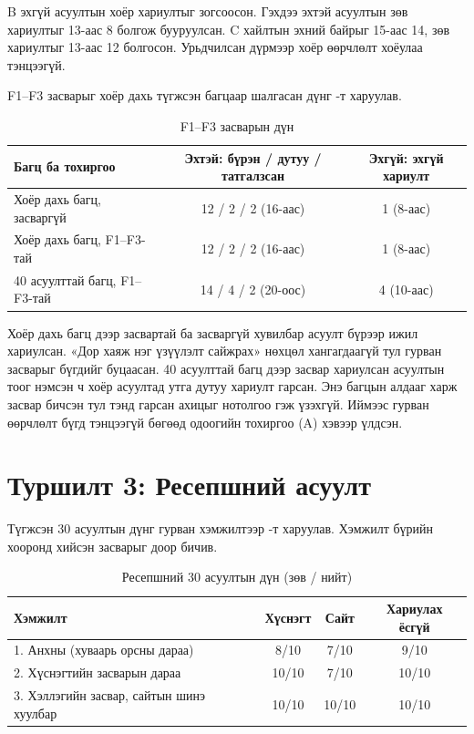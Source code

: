 B эхгүй асуултын хоёр хариултыг зогсоосон. Гэхдээ эхтэй асуултын зөв хариултыг 13-аас 8 болгож бууруулсан. C хайлтын эхний байрыг 15-аас 14, зөв хариултыг 13-аас 12 болгосон. Урьдчилсан дүрмээр хоёр өөрчлөлт хоёулаа тэнцээгүй.

F1--F3 засварыг хоёр дахь түгжсэн багцаар шалгасан дүнг -т харуулав.

\begin{table}[H]
\centering
\caption{F1--F3 засварын дүн}
\label{tab:rag_f1f3}
\begin{tabular}{|p{5.4cm}|c|c|}
\hline
\textbf{Багц ба тохиргоо} & \textbf{Эхтэй: бүрэн / дутуу / татгалзсан} & \textbf{Эхгүй: эхгүй хариулт} \\
\hline
Хоёр дахь багц, засваргүй & 12 / 2 / 2 (16-аас) & 1 (8-аас) \\
Хоёр дахь багц, F1--F3-тай & 12 / 2 / 2 (16-аас) & 1 (8-аас) \\
\hline
40 асуулттай багц, F1--F3-тай & 14 / 4 / 2 (20-оос) & 4 (10-аас) \\
\hline
\end{tabular}
\end{table}

Хоёр дахь багц дээр засвартай ба засваргүй хувилбар асуулт бүрээр ижил хариулсан. «Дор хаяж нэг үзүүлэлт сайжрах» нөхцөл хангагдаагүй тул гурван засварыг бүгдийг буцаасан. 40 асуулттай багц дээр засвар хариулсан асуултын тоог нэмсэн ч хоёр асуултад утга дутуу хариулт гарсан. Энэ багцын алдааг харж засвар бичсэн тул тэнд гарсан ахицыг нотолгоо гэж үзэхгүй. Иймээс гурван өөрчлөлт бүгд тэнцээгүй бөгөөд одоогийн тохиргоо (A) хэвээр үлдсэн.

\section{Туршилт 3: Ресепшний асуулт}
\label{sec:res-reception}

Түгжсэн 30 асуултын дүнг гурван хэмжилтээр -т харуулав. Хэмжилт бүрийн хооронд хийсэн засварыг доор бичив.

\begin{table}[H]
\centering
\caption{Ресепшний 30 асуултын дүн (зөв / нийт)}
\label{tab:reception_runs}
\begin{tabular}{|p{5.2cm}|c|c|c|}
\hline
\textbf{Хэмжилт} & \textbf{Хүснэгт} & \textbf{Сайт} & \textbf{Хариулах ёсгүй} \\
\hline
1. Анхны (хуваарь орсны дараа) & 8/10 & 7/10 & 9/10 \\
2. Хүснэгтийн засварын дараа & 10/10 & 7/10 & 10/10 \\
3. Хэллэгийн засвар, сайтын шинэ хуулбар & 10/10 & 10/10 & 10/10 \\
\hline
\end{tabular}
\end{table}

